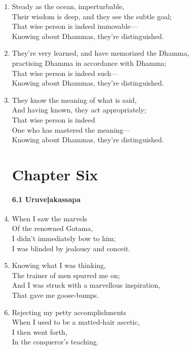 \documentclass[10pt, openany]{book}
\begin{document}
\begin{enumerate}
\item Steady as the ocean, imperturbable,\\
Their wisdom is deep, and they see the subtle goal;\\
That wise person is indeed immovable—\\
Knowing about Dhammas, they’re distinguished.

\item They’re very learned, and have memorized the Dhamma,\\
practising Dhamma in accordance with Dhamma;\\
That wise person is indeed such—\\
Knowing about Dhammas, they’re distinguished.

\item They know the meaning of what is said,\\
And having known, they act appropriately;\\
That wise person is indeed \\
One who has mastered the meaning—\\
Knowing about Dhammas, they’re distinguished.

\chapter*{Chapter Six}

\subsubsection*{6.1 Uruveḷakassapa}

\item When I saw the marvels\\
Of the renowned Gotama,\\
I didn’t immediately bow to him;\\
I was blinded by jealousy and conceit.

\item Knowing what I was thinking,\\
The trainer of men spurred me on;\\
And I was struck with a marvellous inspiration,\\
That gave me goose-bumps.

\item Rejecting my petty accomplishments\\
When I used to be a matted-hair ascetic,\\
I then went forth,\\
In the conqueror’s teaching.


\end{enumerate}
\end{document}

